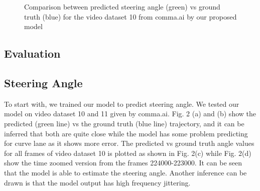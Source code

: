 \documentclass[a4paper,11pt,titlepage,drop]{article}%
\begin{document}
\begin{figure}[H]
\caption{Comparison between predicted steering angle (green) vs ground truth (blue) for the video dataset 10 from comma.ai by our proposed model}
\label{fig:steerangle}
\end{figure}

\subsection{Evaluation}

\subsection*{Steering Angle}

To start with, we trained our model to predict steering angle. We tested our model on video dataset 10 and 11 given by comma.ai. Fig. 2 (a) and (b) show the predicted (green line) vs the ground truth (blue line) trajectory, and it can be inferred that both are quite close while the model has some problem predicting for curve lane as it shows more error. The predicted vs ground truth angle values for all frames of video dataset 10 is plotted as shown in Fig. 2(c) while Fig. 2(d) show the time zoomed version from the frames 224000-223000. It can be seen that the model is able to estimate the steering angle. Another inference can be drawn is that the model output has high frequency jittering.

\end{document}

